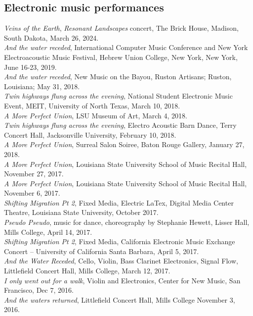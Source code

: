 \documentclass[12pt, a4paper]{article}
\newcommand{\years}[1]{\marginnote{\scriptsize #1}}
\begin{document}
\subsection*{Electronic music performances}
\years{2024} \textit{Veins of the Earth}, \textit{Resonant Landscapes} concert, The Brick House, Madison, South Dakota, March 26, 2024. \\
\years{2019} \textit{And the water receded}, International Computer Music Conference and New York Electroacoustic Music Festival, Hebrew Union College, New York, New York, June 16-23, 2019. \\
\years{2018} \textit{And the water receded}, New Music on the Bayou, Ruston Artisans; Ruston, Louisiana; May 31, 2018. \\  
\textit{Twin highways flung across the evening}, National Student Electronic Music Event, MEIT, University of North Texas, March 10, 2018. \\
\textit{A More Perfect Union}, LSU Museum of Art, March 4, 2018. \\
\textit{Twin highways flung across the evening}, Electro Acoustic Barn Dance, Terry Concert Hall, Jacksonville University, February 10, 2018. \\
\textit{A More Perfect Union}, Surreal Salon Soiree, Baton Rouge Gallery, January 27, 2018.\\
\years{2017}\textit{A  More Perfect Union}, Louisiana State University School of Music Recital Hall, November 27, 2017. \\
\textit{A More Perfect Union}, Louisiana State University School of Music Recital Hall, November 6, 2017.\\
\textit{Shifting Migration Pt 2}, Fixed Media, Electric LaTex, Digital Media Center Theatre, Louisiana State University, October 2017.\\
\textit{Pseudo Pseudo}, music for dance, choreography by Stephanie Hewett, Lisser Hall, Mills College, April 14, 2017. \\
\textit{Shifting Migration Pt 2}, Fixed Media, California Electronic Music Exchange Concert – University of California Santa Barbara, April 5, 2017.\\
\textit{And the Water Receded}, Cello, Violin, Bass Clarinet Electronics, Signal Flow, Littlefield Concert Hall, Mills College, March 12, 2017.\\
\years{2016} \textit{I only went out for a walk}, Violin and Electronics, Center for New Music, San Francisco, Dec 7, 2016.\\
\textit{And the waters returned}, Littlefield Concert Hall, Mills College November 3, 2016.\\
\end{document}
